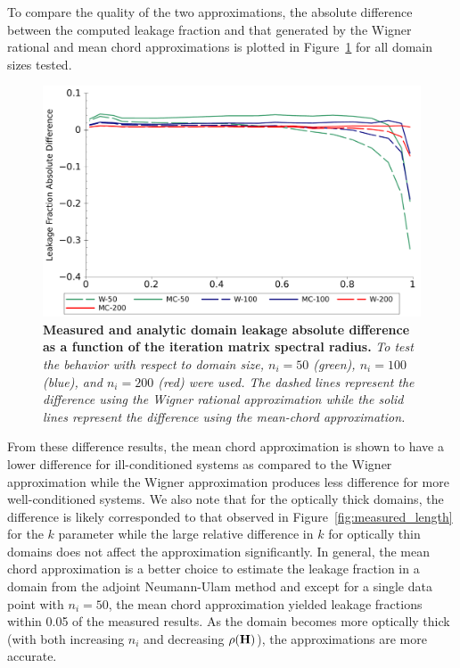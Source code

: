 To compare the quality of the two approximations, the absolute
difference between the computed leakage fraction and that generated by
the Wigner rational and mean chord approximations is plotted in
Figure~\ref{fig:leakage_error} for all domain sizes tested.
\begin{figure}[t!]
  \begin{spacing}{1.0}
    \begin{center}
      \includegraphics[width=4.75in,clip]{chapters/parallel_mc/leakage_error_2.pdf}
    \end{center}
    \caption{\textbf{Measured and analytic domain leakage absolute
        difference as a function of the iteration matrix spectral radius.}
      \textit{To test the behavior with respect to domain size,
        $n_i=50$ (green), $n_i=100$ (blue), and $n_i=200$ (red) were
        used. The dashed lines represent the difference using the Wigner
        rational approximation while the solid lines represent the
        difference using the mean-chord approximation.}}
    \label{fig:leakage_error}
  \end{spacing}
\end{figure}
From these difference results, the mean chord approximation is shown to
have a lower difference for ill-conditioned systems as compared to the
Wigner approximation while the Wigner approximation produces less
difference for more well-conditioned systems. We also note that for the
optically thick domains, the difference is likely corresponded to that
observed in Figure~\ref{fig:measured_length} for the $k$ parameter
while the large relative difference in $k$ for optically thin domains does
not affect the approximation significantly. In general, the mean chord
approximation is a better choice to estimate the leakage fraction in a
domain from the adjoint Neumann-Ulam method and except for a single
data point with $n_i=50$, the mean chord approximation yielded leakage
fractions within 0.05 of the measured results. As the domain becomes
more optically thick (with both increasing $n_i$ and decreasing
$\rho(\mathbf{H})$), the approximations are more accurate.

